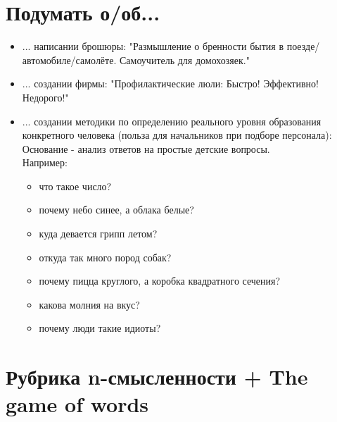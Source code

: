 \documentclass[12pt,a4paper]{article}
\begin{document}
\section*{Подумать о/об...}
\begin{itemize}
\item ... написании брошюры: "Размышление о бренности бытия в поезде/автомобиле/самолёте. Самоучитель для домохозяек."
\item ... создании фирмы: "Профилактические люли: Быстро! Эффективно! Недорого!"
\item ...  создании методики по определению реального уровня образования конкретного человека (польза для начальников при подборе персонала):\\

Основание - анализ ответов на простые детские вопросы.\\
Например:\\
    \begin{itemize}
        \item что такое число?\\
        \item почему небо синее, а облака белые?\\
        \item куда девается грипп летом?\\
        \item откуда так много пород собак?\\
        \item почему пицца круглого, а коробка квадратного сечения?\\
        \item какова молния на вкус?\\
        \item почему люди такие идиоты?
    \end{itemize}
\end{itemize}
\newpage
\section*{Рубрика n-смысленности + The game of words}
\end{document}
